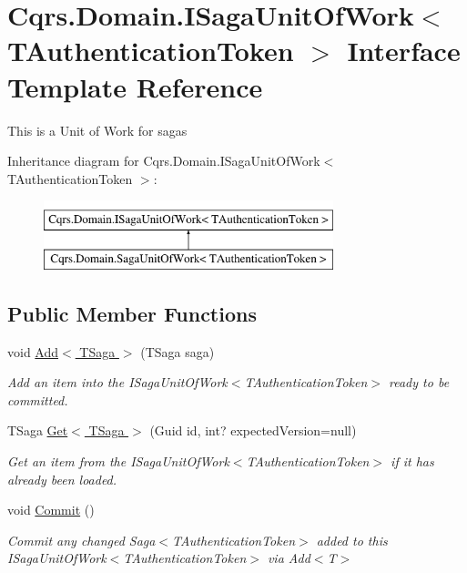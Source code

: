 \hypertarget{interfaceCqrs_1_1Domain_1_1ISagaUnitOfWork}{}\section{Cqrs.\+Domain.\+I\+Saga\+Unit\+Of\+Work$<$ T\+Authentication\+Token $>$ Interface Template Reference}
\label{interfaceCqrs_1_1Domain_1_1ISagaUnitOfWork}


This is a Unit of Work for sagas  


Inheritance diagram for Cqrs.\+Domain.\+I\+Saga\+Unit\+Of\+Work$<$ T\+Authentication\+Token $>$\+:\begin{figure}[H]
\begin{center}
\leavevmode
\includegraphics[height=2.000000cm]{interfaceCqrs_1_1Domain_1_1ISagaUnitOfWork}
\end{center}
\end{figure}
\subsection*{Public Member Functions}
\begin{DoxyCompactItemize}
\item 
void \hyperlink{interfaceCqrs_1_1Domain_1_1ISagaUnitOfWork_a5e7c8e18a8d71fc915db48fac00e7da4}{Add$<$ T\+Saga $>$} (T\+Saga saga)
\begin{DoxyCompactList}\small\item\em Add an item into the I\+Saga\+Unit\+Of\+Work$<$\+T\+Authentication\+Token$>$ ready to be committed. \end{DoxyCompactList}\item 
T\+Saga \hyperlink{interfaceCqrs_1_1Domain_1_1ISagaUnitOfWork_a4c4745fcebc42ba5c94647b22939809b}{Get$<$ T\+Saga $>$} (Guid id, int? expected\+Version=null)
\begin{DoxyCompactList}\small\item\em Get an item from the I\+Saga\+Unit\+Of\+Work$<$\+T\+Authentication\+Token$>$ if it has already been loaded. \end{DoxyCompactList}\item 
void \hyperlink{interfaceCqrs_1_1Domain_1_1ISagaUnitOfWork_aaa8a63b5304c837deec8a0103eb702f7}{Commit} ()
\begin{DoxyCompactList}\small\item\em Commit any changed Saga$<$\+T\+Authentication\+Token$>$ added to this I\+Saga\+Unit\+Of\+Work$<$\+T\+Authentication\+Token$>$ via Add$<$\+T$>$ \end{DoxyCompactList}\end{DoxyCompactItemize}


